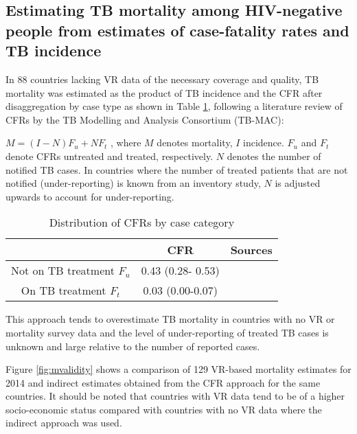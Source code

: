\subsection{Estimating TB mortality among HIV-negative people from estimates of case-fatality rates and TB incidence
}

In 88 countries lacking VR data of the necessary coverage and quality, TB mortality was estimated as the product of TB incidence and the CFR after disaggregation by case type as shown in Table \ref{tab:cfr}, following a literature review of CFRs by the TB Modelling and Analysis Consortium (TB-MAC):

$M = (I-N)F_u + NF_t$ , where $M$ denotes mortality, $I$ incidence. $F_u$ and $F_t$ denote CFRs untreated and treated, respectively. $N$ denotes the number of notified TB cases. In countries where the number of treated patients that are not notified (under-reporting) is known from an inventory study, $N$ is adjusted upwards to account for under-reporting. 

\begin{table} 
\label{tab:cfr}
    \begin{tabular}{ c c c }
    \hline
         & CFR & Sources \\ 
         \hline
        Not on TB treatment $F_u$ & 0.43 (0.28- 0.53) &  \cite{12742798} \cite{21483732} \\ 
        On TB treatment $F_t$ & 0.03 (0.00-0.07) &  \cite{21738585} \\ 
        \hline
    \end{tabular} 
    \caption{Distribution of CFRs by case category} 
\end{table}

This approach tends to overestimate TB mortality in countries with no VR or mortality survey data and the level of under-reporting of treated TB cases is unknown and large relative to the number of reported cases. 

Figure \ref{fig:mvalidity} shows a comparison of 129 VR-based mortality estimates for 2014 and indirect estimates obtained from the CFR approach for the same countries. It should be noted that countries with VR data tend to be of a higher socio-economic status compared with countries with no VR data where the indirect approach was used.


